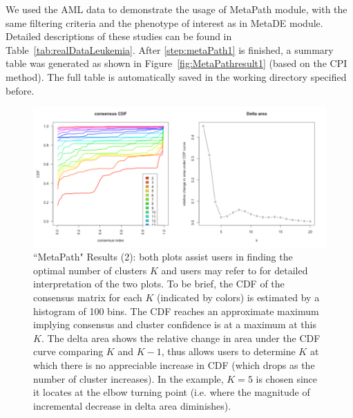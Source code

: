 We used the AML data to demonstrate the usage of MetaPath module,
with the same filtering criteria and the phenotype of interest as in MetaDE module.
Detailed descriptions of these studies can be found in Table~\ref{tab:realDataLeukemia}. 
After \ref{step:metaPath1} is finished, a summary table was generated as shown in Figure~\ref{fig:MetaPathresult1} (based on the CPI method). 
The full table is automatically saved in the working directory specified before.  

\begin{figure}[H]
\begin{center}
\includegraphics[scale=0.5]{./figure/metaPath/metaPathresult2.png}
\caption{``MetaPath" Results (2):
both plots assist users in finding the optimal number of clusters $K$ and users may refer to \cite{monti2003consensus} for detailed interpretation of the two plots. 
To be brief, the CDF of the consensus matrix for each $K$ (indicated by colors) is estimated by a histogram of 100 bins. 
The CDF reaches an approximate maximum implying consensus and cluster confidence is at a maximum at this $K$. 
The delta area shows the relative change in area under the CDF curve comparing $K$ and $K - 1$, thus allows users to determine $K$ at which there is no appreciable increase in CDF (which drops as the number of cluster increases).
In the example, $K=5$ is chosen since it locates at the elbow turning point (i.e. where the magnitude of incremental decrease in delta area diminishes).
}
\label{fig:MetaPathresult2}
\end{center}
\end{figure}

